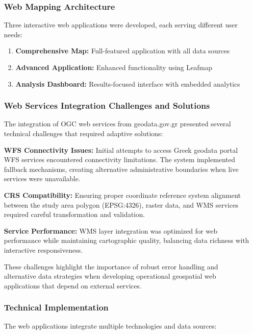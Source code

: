 \documentclass[a4paper,12pt]{article}
\begin{document}
\subsubsection{Web Mapping Architecture}

Three interactive web applications were developed, each serving different user
needs:

\begin{enumerate}
    \item \textbf{Comprehensive Map:} Full-featured application with all data sources
    \item \textbf{Advanced Application:} Enhanced functionality using Leafmap
    \item \textbf{Analysis Dashboard:} Results-focused interface with embedded analytics
\end{enumerate}

\subsubsection{Web Services Integration Challenges and Solutions}

The integration of OGC web services from geodata.gov.gr presented several
technical challenges that required adaptive solutions:

\textbf{WFS Connectivity Issues:} Initial attempts to access Greek geodata
portal WFS services encountered connectivity limitations. The system
implemented fallback mechanisms, creating alternative administrative boundaries
when live services were unavailable.

\textbf{CRS Compatibility:} Ensuring proper coordinate reference system
alignment between the study area polygon (EPSG:4326), raster data, and WMS
services required careful transformation and validation.

\textbf{Service Performance:} WMS layer integration was optimized for web
performance while maintaining cartographic quality, balancing data richness
with interactive responsiveness.

These challenges highlight the importance of robust error handling and
alternative data strategies when developing operational geospatial web
applications that depend on external services.

\subsubsection{Technical Implementation}

The web applications integrate multiple technologies and data sources:
\end{document}
